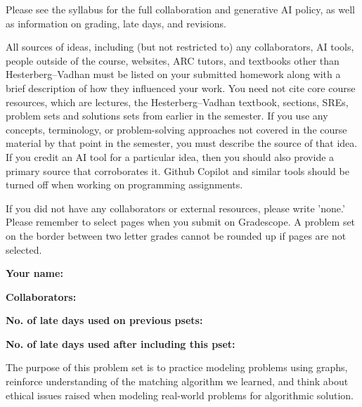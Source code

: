 \documentclass[11pt]{article}
\begin{document}

Please see the syllabus for the full collaboration and generative AI policy, as well as information on grading, late days, and revisions.

All sources of ideas, including (but not restricted to) any collaborators, AI tools, people outside of the course, websites, ARC tutors, and textbooks other than Hesterberg--Vadhan must be listed on your submitted homework along with a brief description of how they influenced your work. You need not cite core course resources, which are lectures, the Hesterberg--Vadhan textbook, sections, SREs, problem sets and solutions sets from earlier in the semester. If you use any concepts, terminology, or problem-solving approaches not covered in the course material by that point in the semester, you must describe the source of that idea. If you credit an AI tool for a particular idea, then you should also provide a primary source that corroborates it. Github Copilot and similar tools should be turned off when working on programming assignments.

If you did not have any collaborators or external resources, please write 'none.' Please remember to select pages when you submit on Gradescope. A problem set on the border between two letter grades cannot be rounded up if pages are not selected. 

\textbf{Your name: }

\textbf{Collaborators: }

\textbf{No. of late days used on previous psets: }

\textbf{No. of late days used after including this pset: }


The purpose of this problem set is to practice modeling problems using graphs, reinforce understanding of the matching algorithm we learned, and think about ethical issues raised when modeling real-world problems for algorithmic solution.
\end{document}

